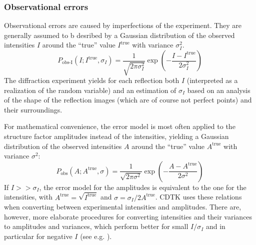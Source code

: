 \documentclass[11pt]{article}
\begin{document}
\begin{sloppy}
\subsubsection{Observational errors}

Observational errors are caused by imperfections of the experiment.
They are generally assumed to b desribed by a Gaussian distribution of
the observed intensities $I$ around the ``true'' value
$I^{\mbox{true}}$ with variance $\sigma_I^2$.
\begin{equation}
P_{\mbox{obs-I}}(I; I^{\mbox{true}}, \sigma_I) =
     \frac{1}{\sqrt{2\pi\sigma_I^2}}
           \exp \left( - \frac{I-I^{\mbox{true}}}{2 \sigma_I^2}\right)
\end{equation}
The diffraction experiment yields for each reflection both $I$
(interpreted as a realization of the random variable) and an
estimation of $\sigma_I$ based on an analysis of the shape of the
reflection images (which are of course not perfect points) and their
surroundings.

For mathematical convenience, the error model is most often applied to
the structure factor amplitudes instead of the intensities, yielding a
Gaussian distribution of the observed intensities $A$ around the
``true'' value $A^{\mbox{true}}$ with variance $\sigma^2$:
\begin{equation}
\label{gaussian_amplitude}
P_{\mbox{obs}}(A; A^{\mbox{true}}, \sigma) =
      \frac{1}{\sqrt{2\pi\sigma^2}}
           \exp \left( - \frac{A-A^{\mbox{true}}}{2 \sigma^2}\right)
\end{equation}
If $I >> \sigma_I$, the error model for the amplitudes is equivalent
to the one for the intensities, with $A^{\mbox{true}} =
\sqrt{I^{\mbox{true}}}$ and $\sigma = \sigma_I/2 A^{\mbox{true}}$.
CDTK uses these relations when converting between experimental
intensities and amplitudes. There are, however, more elaborate
procedures for converting intensities and their variances to
amplitudes and variances, which perform better for small $I/\sigma_I$
and in particular for negative $I$ (see e.g. \cite{FrWi1978}).

\vspace{3mm}


\end{sloppy}
\end{document}
